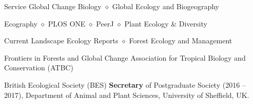 
\begin{rubric}{Service}
    Global Change Biology $\diamond$ Global Ecology and Biogeography \par  Ecography $\diamond$ PLOS ONE $\diamond$ PeerJ $\diamond$ Plant Ecology \& Diversity \par Current Landscape Ecology Reports $\diamond$ Forest Ecology and Management \par Frontiers in Forests and Global Change
	Association for Tropical Biology and Conservation (ATBC) 
	\par British Ecological Society (BES)
    \textbf{Secretary} of Postgraduate Society (2016 -- 2017), Department of Animal and Plant Sciences, University of Sheffield, UK.
\end{rubric}
